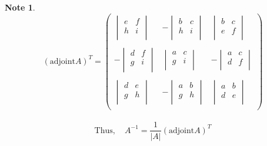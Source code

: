 \documentclass[11pt,a4paper]{article}
\theoremstyle{definition}
\newtheorem{note}[thm]{Note}
\begin{document}
\begin{note}
$$
(\text{adjoint} A)^T=
\begin{pmatrix}
\begin{vmatrix}
e & f\\
h & i\\
\end{vmatrix}
& -
\begin{vmatrix}
b & c\\
h & i\\
\end{vmatrix}
&
\begin{vmatrix}
b & c\\
e & f\\
\end{vmatrix}\\\\
-
\begin{vmatrix}
d & f\\
g & i\\
\end{vmatrix}
&
\begin{vmatrix}
a & c\\
g & i\\
\end{vmatrix}
& -
\begin{vmatrix}
a & c\\
d & f\\
\end{vmatrix}\\\\
\begin{vmatrix}
d & e\\
g & h\\
\end{vmatrix}
& -
\begin{vmatrix}
a & b\\
g & h\\
\end{vmatrix}
&
\begin{vmatrix}
a & b\\
d & e\\
\end{vmatrix}\\
\end{pmatrix}
$$\\


$$\text{Thus},\quad  A^{-1}=\frac{1}{|A|}(\text{adjoint} A )^T$$
\end{note}
\end{document}
